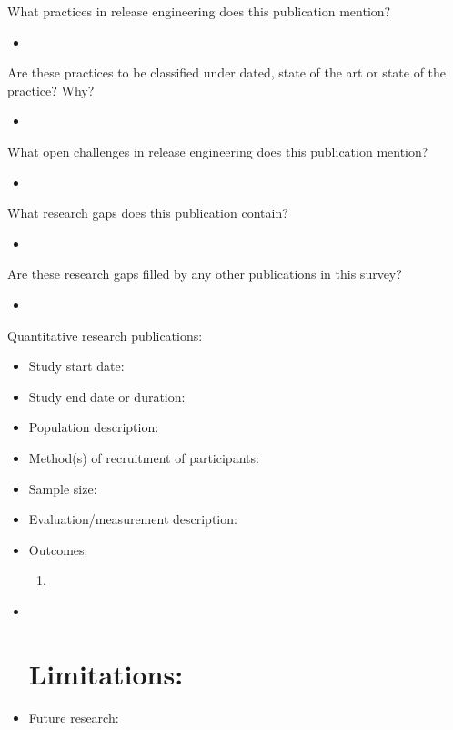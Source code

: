 \documentclass[]{book}
\begin{document}
What practices in release engineering does this publication mention?

\begin{itemize}
\item
\end{itemize}

Are these practices to be classified under dated, state of the art or
state of the practice? Why?

\begin{itemize}
\item
\end{itemize}

What open challenges in release engineering does this publication
mention?

\begin{itemize}
\item
\end{itemize}

What research gaps does this publication contain?

\begin{itemize}
\item
\end{itemize}

Are these research gaps filled by any other publications in this survey?

\begin{itemize}
\item
\end{itemize}

Quantitative research publications:

\begin{itemize}
\item
  Study start date:
\item
  Study end date or duration:
\item
  Population description:
\item
  Method(s) of recruitment of participants:
\item
  Sample size:
\item
  Evaluation/measurement description:
\item
  Outcomes:

  \begin{enumerate}
  \def\labelenumi{\arabic{enumi}.}
  \item
  \end{enumerate}
\item ~
  \section{Limitations:}\label{limitations-1}
\item
  Future research:
\end{itemize}
\end{document}
